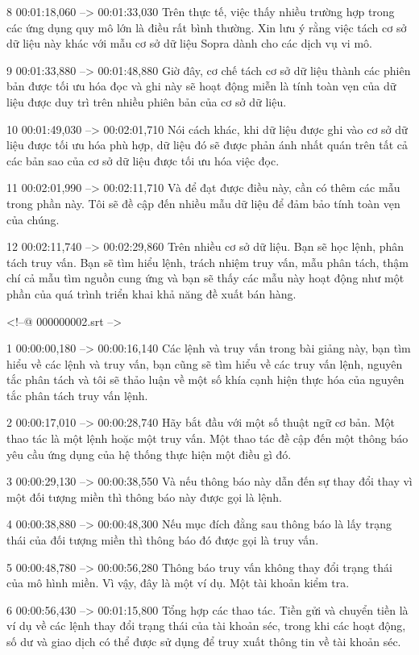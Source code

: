 8
00:01:18,060 --> 00:01:33,030
Trên thực tế, việc thấy nhiều trường hợp trong các ứng dụng quy mô lớn là điều rất bình thường.  Xin lưu ý rằng việc tách cơ sở dữ liệu này khác với mẫu cơ sở dữ liệu Sopra dành cho các dịch vụ vi mô.

9
00:01:33,880 --> 00:01:48,880
Giờ đây, cơ chế tách cơ sở dữ liệu thành các phiên bản được tối ưu hóa đọc và ghi này sẽ hoạt động miễn là tính toàn vẹn của dữ liệu được duy trì trên nhiều phiên bản của cơ sở dữ liệu.

10
00:01:49,030 --> 00:02:01,710
Nói cách khác, khi dữ liệu được ghi vào cơ sở dữ liệu được tối ưu hóa phù hợp, dữ liệu đó sẽ được phản ánh nhất quán trên tất cả các bản sao của cơ sở dữ liệu được tối ưu hóa việc đọc.

11
00:02:01,990 --> 00:02:11,710
Và để đạt được điều này, cần có thêm các mẫu trong phần này.  Tôi sẽ đề cập đến nhiều mẫu dữ liệu để đảm bảo tính toàn vẹn của chúng.

12
00:02:11,740 --> 00:02:29,860
Trên nhiều cơ sở dữ liệu.  Bạn sẽ học lệnh, phân tách truy vấn.  Bạn sẽ tìm hiểu lệnh, trách nhiệm truy vấn, mẫu phân tách, thậm chí cả mẫu tìm nguồn cung ứng và bạn sẽ thấy các mẫu này hoạt động như một phần của quá trình triển khai khả năng đề xuất bán hàng.

<!--@ 000000002.srt -->

1
00:00:00,180 --> 00:00:16,140
Các lệnh và truy vấn trong bài giảng này, bạn tìm hiểu về các lệnh và truy vấn, bạn cũng sẽ tìm hiểu về các truy vấn lệnh, nguyên tắc phân tách và tôi sẽ thảo luận về một số khía cạnh hiện thực hóa của nguyên tắc phân tách truy vấn lệnh.

2
00:00:17,010 --> 00:00:28,740
Hãy bắt đầu với một số thuật ngữ cơ bản.  Một thao tác là một lệnh hoặc một truy vấn.  Một thao tác đề cập đến một thông báo yêu cầu ứng dụng của hệ thống thực hiện một điều gì đó.

3
00:00:29,130 --> 00:00:38,550
Và nếu thông báo này dẫn đến sự thay đổi thay vì một đối tượng miền thì thông báo này được gọi là lệnh.

4
00:00:38,880 --> 00:00:48,300
Nếu mục đích đằng sau thông báo là lấy trạng thái của đối tượng miền thì thông báo đó được gọi là truy vấn.

5
00:00:48,780 --> 00:00:56,280
Thông báo truy vấn không thay đổi trạng thái của mô hình miền.  Vì vậy, đây là một ví dụ.  Một tài khoản kiểm tra.

6
00:00:56,430 --> 00:01:15,800
Tổng hợp các thao tác.  Tiền gửi và chuyển tiền là ví dụ về các lệnh thay đổi trạng thái của tài khoản séc, trong khi các hoạt động, số dư và giao dịch có thể được sử dụng để truy xuất thông tin về tài khoản séc.

